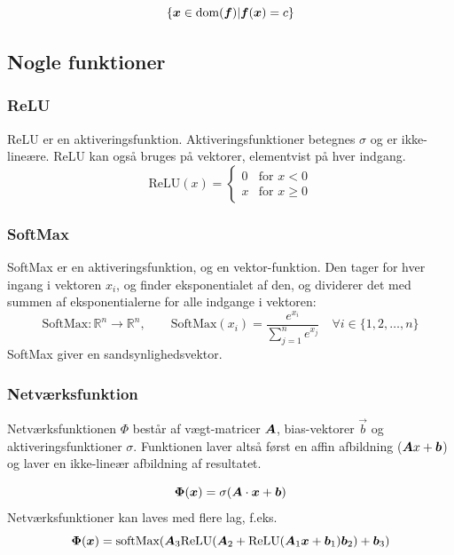 \[
    \{\boldsymbol{x} \in \operatorname{dom}(\boldsymbol{f}) | \boldsymbol{f}(\boldsymbol{x}) = c\}
\]

\subsection{Nogle funktioner}
\subsubsection{ReLU}
ReLU er en aktiveringsfunktion. Aktiveringsfunktioner betegnes $\sigma$ og er ikke-lineære.
ReLU kan også bruges på vektorer, elementvist på hver indgang.
\[
\text{ReLU}(x) =
    \begin{cases}
    0 & \text{for } x < 0 \\
    x & \text{for } x \geq 0
    \end{cases}
\]

\subsubsection{SoftMax}
SoftMax er en aktiveringsfunktion, og en vektor-funktion. Den tager for hver ingang i vektoren $x_i$, og finder eksponentialet af den, og dividerer det med summen af eksponentialerne for alle indgange i vektoren:
\[
    \text{SoftMax}: \mathbb R^n \to \mathbb R^n, \qquad 
    \text{SoftMax}(x_i) = \frac{e^{x_i}}{\sum_{j=1}^n e^{x_j}} \quad
    \forall i \in \{1, 2, \ldots, n\}
\]
SoftMax giver en sandsynlighedsvektor.

\subsubsection{Netværksfunktion}
Netværksfunktionen $\Phi$ består af vægt-matricer $\boldsymbol{A}$, bias-vektorer $\vec b$ og aktiveringsfunktioner $\sigma$.
Funktionen laver altså først en affin afbildning ($\boldsymbol{A} x + \boldsymbol{b}$) og laver en ikke-lineær afbildning af resultatet.


\[
    \boldsymbol{\Phi}(\boldsymbol{x}) = \sigma(\boldsymbol{A} \cdot \boldsymbol{x} + \boldsymbol{b})
\]
Netværksfunktioner kan laves med flere lag, f.eks.
\[
    \boldsymbol{\Phi}(\boldsymbol{x}) = \text{softMax}(\boldsymbol{A}_3 \text{ReLU}(\boldsymbol{A}_2 + \text{ReLU}(\boldsymbol{A}_1 \boldsymbol{x} + \boldsymbol{b}_1) \boldsymbol{b}_2) + \boldsymbol{b}_3)
\]